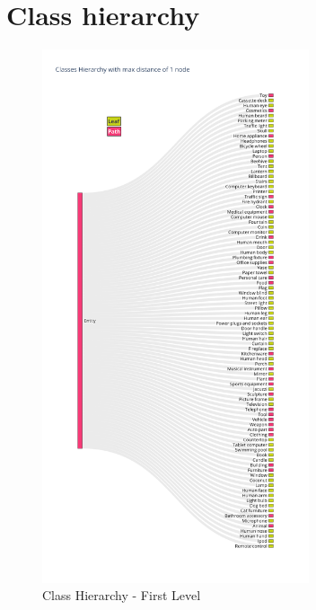 \documentclass[11pt, a4paper, twocolumn]{article}
\begin{document}
\begin{appendices}
	\label{sec:appendix-a}
	\section {Class hierarchy}
	
	\begin{figure}[!ht]
		\centering
		\includegraphics[width=0.7\textwidth]{lvl1_classes.png}
		\caption{\scriptsize Class Hierarchy - First Level}
	\end{figure}
	

\end{appendices}
\end{document}
